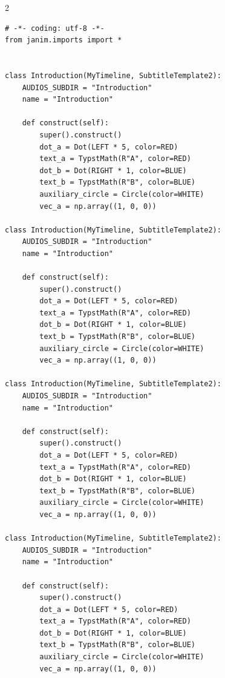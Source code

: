 \begingroup
\setlength{\columnseprule}{0pt}
\begin{multicols}{2}
\begin{verbatim}
# -*- coding: utf-8 -*-
from janim.imports import *


class Introduction(MyTimeline, SubtitleTemplate2):
    AUDIOS_SUBDIR = "Introduction"
    name = "Introduction"

    def construct(self):
        super().construct()
        dot_a = Dot(LEFT * 5, color=RED)
        text_a = TypstMath(R"A", color=RED)
        dot_b = Dot(RIGHT * 1, color=BLUE)
        text_b = TypstMath(R"B", color=BLUE)
        auxiliary_circle = Circle(color=WHITE)
        vec_a = np.array((1, 0, 0))

class Introduction(MyTimeline, SubtitleTemplate2):
    AUDIOS_SUBDIR = "Introduction"
    name = "Introduction"

    def construct(self):
        super().construct()
        dot_a = Dot(LEFT * 5, color=RED)
        text_a = TypstMath(R"A", color=RED)
        dot_b = Dot(RIGHT * 1, color=BLUE)
        text_b = TypstMath(R"B", color=BLUE)
        auxiliary_circle = Circle(color=WHITE)
        vec_a = np.array((1, 0, 0))

class Introduction(MyTimeline, SubtitleTemplate2):
    AUDIOS_SUBDIR = "Introduction"
    name = "Introduction"

    def construct(self):
        super().construct()
        dot_a = Dot(LEFT * 5, color=RED)
        text_a = TypstMath(R"A", color=RED)
        dot_b = Dot(RIGHT * 1, color=BLUE)
        text_b = TypstMath(R"B", color=BLUE)
        auxiliary_circle = Circle(color=WHITE)
        vec_a = np.array((1, 0, 0))

class Introduction(MyTimeline, SubtitleTemplate2):
    AUDIOS_SUBDIR = "Introduction"
    name = "Introduction"

    def construct(self):
        super().construct()
        dot_a = Dot(LEFT * 5, color=RED)
        text_a = TypstMath(R"A", color=RED)
        dot_b = Dot(RIGHT * 1, color=BLUE)
        text_b = TypstMath(R"B", color=BLUE)
        auxiliary_circle = Circle(color=WHITE)
        vec_a = np.array((1, 0, 0))
\end{verbatim}
\end{multicols}
\endgroup